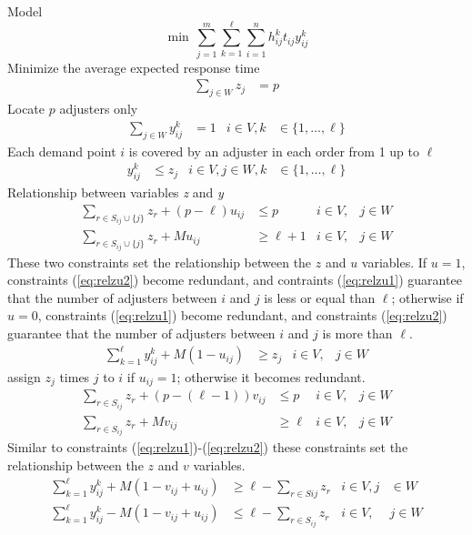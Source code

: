 Model
\begin{equation}
  \min \, \sum_{j=1}^{m}{
    \sum_{k=1}^{\ell}{
      \sum_{i=1}^{n}{
        h_{ij}^{k}t_{ij}y_{ij}^{k}
      }
    }
  }
\end{equation}
Minimize the average expected response time
\begin{align}
  \sum_{j \in W}{z_j}
  & = p
\end{align}
Locate $p$ adjusters only
\begin{align}
  \sum_{j \in W}{y_{ij}^{k}}
  & = 1
  & i \in V, k
  &\in \{1,\ldots,\ell\}
\end{align}
Each demand point $i$ is covered by an adjuster in each order
from 1 up to $\ell$
\begin{align}
  y_{ij}^{k}
  & \leq z_j
  & i \in V,j \in W, k
  &\in \{1,\ldots,\ell\}
\end{align}
Relationship between variables \textit{z} and \textit{y}
\begin{align}
  \label{eq:relzu1}
  \sum_{r \in S_{ij}\cup\{j\}}{
    z_{r}
  }
  + (p-\ell) u_{ij}
  & \leq p
  & i \in V,
  & j \in W 
  \\
  \label{eq:relzu2}
  \sum_{r \in S_{ij}\cup\{j\}}{
    z_{r}
  }
  + M u_{ij}
  & \geq \ell+1
  & i \in V,
  & j \in W
\end{align}
These two constraints
set the relationship
between the $z$ and $u$ variables.
If $u = 1$,
constraints (\ref{eq:relzu2}) become redundant,
and contraints (\ref{eq:relzu1}) guarantee
that the number of adjusters between $i$ and $j$
is less or equal than $\ell$;
otherwise
if $u = 0$,
constraints (\ref{eq:relzu1}) become redundant,
and constraints (\ref{eq:relzu2}) guarantee
that the number of adjusters between $i$ and $j$
is more than $\ell$.
\begin{align}
  \sum_{k = 1}^{\ell}{
    y_{ij}^{k}
  }
  + M (1 - u_{ij})
  & \geq z_j
  & i \in V,
  & j \in W
\end{align}
assign $z_j$ times $j$ to $i$ if $u_{ij}=1$;
otherwise
it becomes redundant.
\begin{align}
  \sum_{r \in S_{ij}}{
    z_{r}
  }
  + (p-(\ell-1)) v_{ij}
  & \leq p
  & i \in V,
  & j \in W
  \\
  \sum_{r \in S_{ij}}{
    z_{r}
  }
  + M v_{ij}
  & \geq \ell
  & i \in V,
  & j \in W
\end{align}
Similar to constraints (\ref{eq:relzu1})-(\ref{eq:relzu2})
these constraints
set the relationship
between the $z$ and $v$ variables.
\begin{align}
  \sum_{k=1}^{\ell}{
    y_{ij}^{k}
  }
  + M (1 - v_{ij} + u_{ij})
  & \geq \ell
  - \sum_{r \in S{ij}}{
    z_{r}
  } 
  &  i \in V, j 
  & \in W
  \\
  \sum_{k=1}^{\ell}{
    y_{ij}^{k}
  }
  - M (1 - v_{ij} + u_{ij})
  & \leq \ell 
  - \sum_{r \in S_{ij}}{
    z_{r}
  }
  & i \in V,
  & j \in W
\end{align}

